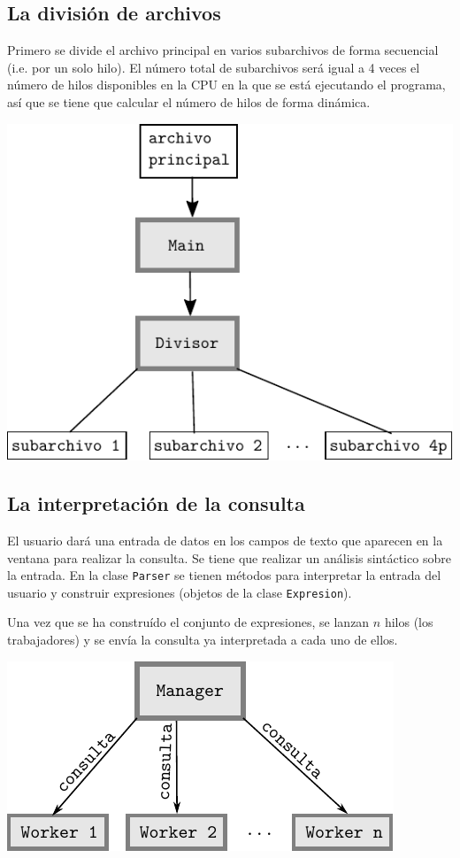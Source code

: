 \documentclass{article}
\begin{document}
\subsection{La división de archivos}

Primero se divide el archivo principal en varios subarchivos de forma secuencial (i.e. por un solo hilo). El número total de subarchivos será igual a 4 veces el número de hilos disponibles en la CPU en la que se está ejecutando el programa, así que se tiene que calcular el número de hilos de forma dinámica.

\begin{center}
\includegraphics[scale=1]{division}
\end{center}

\subsection{La interpretación de la consulta}

El usuario dará una entrada de datos en los campos de texto que aparecen en la ventana para realizar la consulta. Se tiene que realizar un análisis sintáctico sobre la entrada. En la clase \texttt{Parser} se tienen métodos para interpretar la entrada del usuario y construir expresiones (objetos de la clase \texttt{Expresion}).

Una vez que se ha construído el conjunto de expresiones, se lanzan $n$ hilos (los trabajadores) y se envía la consulta ya interpretada a cada uno de ellos.

\begin{center}
\includegraphics[scale=1]{lanzar}
\end{center}
\end{document}
